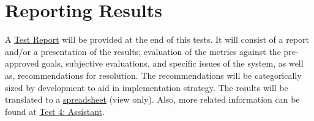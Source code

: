 \section{Reporting Results}
\label{sec:sec009}

A \hyperlink{https://github.com/mida-project/research-reports}{Test Report} will be provided at the end of this tests. It will consist of a report and/or a presentation of the results; evaluation of the metrics against the pre-approved goals, subjective evaluations, and specific issues of the system, as well as, recommendations for resolution. The recommendations will be categorically sized by development to aid in implementation strategy. The results will be translated to a \hyperlink{https://docs.google.com/spreadsheets/d/1CoPLONnINdBWryGs7SBRuPZA-DnQ0t_yzx3u8ym0UoI/edit?usp=sharing}{spreadsheet} (view only). Also, more related information can be found at \hyperlink{https://github.com/MIMBCD-UI/prototype-breast-screening/wiki/User-Test-Evaluation}{Test 4: Assistant}.